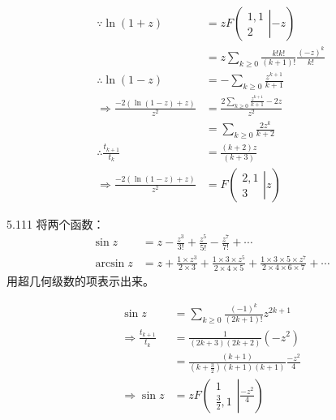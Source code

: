 \begin{align*}
  \because
  \ln{(1+z)} &= z F
  \left( \left.
    \begin{array}{cccc}
      1, 1 \\
      2
  \end{array} \right|{-z} \right) \\
  &= z \sum_{k \ge 0} \frac{k! k!}{(k+1)!} \frac{(-z)^k}{k!} \\
  \therefore \ln{(1-z)} &= - \sum_{k \ge 0} \frac{z^{k+1}}{k+1} \\
  \Rightarrow \frac{-2 (\ln{(1-z)} + z)}{z^2} &= \frac{2 \sum_{k \ge 0} \frac{z^{k+1}}{k+1} - 2z}{z^2} \\
  &= \sum_{k \ge 0} \frac{2 z^k}{k+2} \\
  \therefore \frac{t_{k+1}}{t_k} &= \frac{(k+2) z}{(k+3)} \\[6pt]
  \Rightarrow \frac{-2 (\ln{(1-z)} + z)}{z^2} &= F
  \left( \left.
    \begin{array}{cccc}
      2, 1 \\
      3
  \end{array} \right|{z} \right)
\end{align*}

\begin{problem}{5.11}{1}
  将两个函数：
  \begin{align*}
    \sin{z} &= z - \frac{z^3}{3!} + \frac{z^5}{5!} - \frac{z^7}{7!} + \cdots \\
    \arcsin{z} &= z + \frac{1 \times z^3}{2 \times 3} + \frac{1 \times 3 \times z^5}{2 \times 4 \times 5} + \frac{1 \times 3 \times 5 \times z^7}{2 \times 4 \times 6 \times 7} + \cdots
  \end{align*}
  用超几何级数的项表示出来。
\end{problem}

\begin{align*}
  \sin{z} &= \sum_{k \ge 0}  \frac{(-1)^k}{(2k+1)!} z^{2k+1} \\
  \Rightarrow \frac{t_{k+1}}{t_k} &= \frac{1}{(2k+3)(2k+2)} (-z^2) \\
  &= \frac{(k+1)}{(k+ \frac{3}{2}) (k+1) (k+1)} \frac{-z^2}{4} \\[6pt]
  \Rightarrow \sin{z} &= z F
  \left( \left.
    \begin{array}{cccc}
      1 \\
      \frac{3}{2} , 1
  \end{array} \right|{\frac{-z^2}{4}} \right)
\end{align*}

